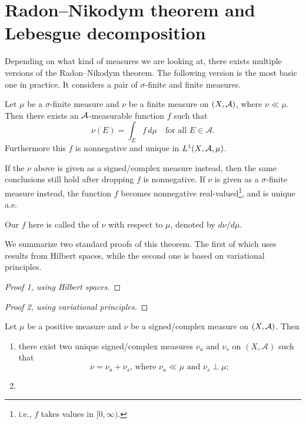 \section{Radon--Nikodym theorem and Lebesgue decomposition}
Depending on what kind of measures we are looking at, there exists multiple versions of the Radon--Nikodym theorem. The following version is the most basic one in practice. It considers a pair of $\sigma$-finite and finite measures.
\begin{namedthm} \label{thm:Radon-Nikodym}
    Let $\mu$ be a $\sigma$-finite measure and $\nu$ be a finite measure on $(X,\mathcal{A})$, where $\nu \ll \mu$. Then there exists an $\mathcal{A}$-measurable function $f$ such that \[
        \nu(E) = \int_E f \,d\mu \quad \text{for all }E\in \mathcal{A}.
    \]
    Furthermore this $f$ is nonnegative and unique in $L^1(X,\mathcal{A},\mu)$.

    If the $\nu$ above is given as a signed/complex measure instead, then the same conclusions still hold after dropping $f$ is nonnegative. If $\nu$ is given as a $\sigma$-finite measure instead, the function $f$ becomes nonnegative real-valued\footnote{i.e., $f$ takes values in $[0,\infty)$.}, and is unique a.e.
\end{namedthm}
Our $f$ here is called the  of $\nu$ with respect to $\mu$, denoted by $d\nu/d\mu$.

We summarize two standard proofs of this theorem. The first of which uses results from Hilbert spaces, while the second one is based on variational principles.
\begin{proof}[Proof 1, using Hilbert spaces]
    
\end{proof}
\begin{proof}[Proof 2, using variational principles]
    
\end{proof}

\begin{namedthm}\label{thm:Leb-decomp}
     Let $\mu$ be a positive measure and $\nu$ be a signed/complex measure on $(X,\mathcal{A})$. Then 
     \begin{enumerate}
         \item \label{enu:decomp} there exist two unique signed/complex measures $\nu_a$ and $\nu_s$ on $(X,\mathcal{A})$ such that \[
            \nu = \nu_{a} + \nu_{s}\text{, where }\nu_a \ll \mu \text{ and } \nu_s \perp \mu;
         \]
         \item \label{enu:derivative} %
     \end{enumerate}
\end{namedthm}

